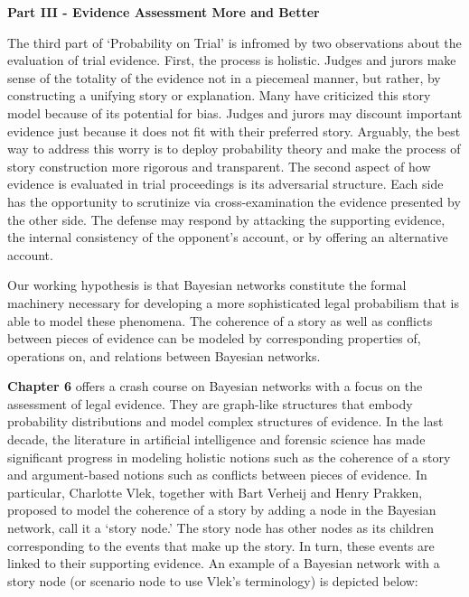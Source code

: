 \documentclass[
  10pt,
  dvipsnames,enabledeprecatedfontcommands]{scrartcl}
\begin{document}
\noindent \textbf{Part III - Evidence Assessment More and Better}

\noindent The third part of `Probability on Trial' is infromed by two
observations about the evaluation of trial evidence. First, the process
is holistic. Judges and jurors make sense of the totality of the
evidence not in a piecemeal manner, but rather, by constructing a
unifying story or explanation. Many have criticized this story model
because of its potential for bias. Judges and jurors may discount
important evidence just because it does not fit with their preferred
story. Arguably, the best way to address this worry is to deploy
probability theory and make the process of story construction more
rigorous and transparent. The second aspect of how evidence is evaluated
in trial proceedings is its adversarial structure. Each side has the
opportunity to scrutinize via cross-examination the evidence presented
by the other side. The defense may respond by attacking the supporting
evidence, the internal consistency of the opponent's account, or by
offering an alternative account.

Our working hypothesis is that Bayesian networks constitute the formal
machinery necessary for developing a more sophisticated legal
probabilism that is able to model these phenomena. The coherence of a
story as well as conflicts between pieces of evidence can be modeled by
corresponding properties of, operations on, and relations between
Bayesian networks.

\textbf{Chapter 6} offers a crash course on Bayesian networks with a
focus on the assessment of legal evidence. They are graph-like
structures that embody probability distributions and model complex
structures of evidence. In the last decade, the literature in artificial
intelligence and forensic science has made significant progress in
modeling holistic notions such as the coherence of a story and
argument-based notions such as conflicts between pieces of evidence. In
particular, Charlotte Vlek, together with Bart Verheij and Henry
Prakken, proposed to model the coherence of a story by adding a node in
the Bayesian network, call it a `story node.' The story node has other
nodes as its children corresponding to the events that make up the
story. In turn, these events are linked to their supporting evidence. An
example of a Bayesian network with a story node (or scenario node to use
Vlek's terminology) is depicted below:

\vspace{-2mm}
\end{document}
